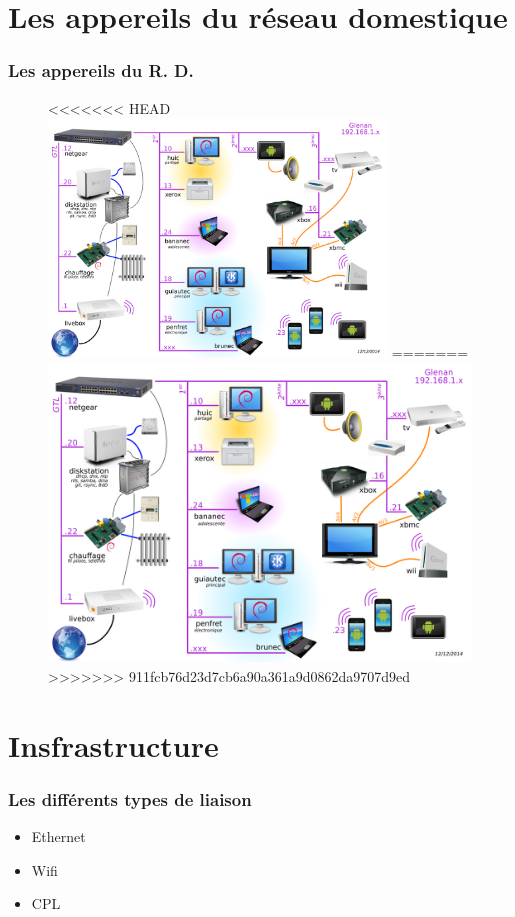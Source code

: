 \documentclass[handout]{beamer}
\begin{document}
\section{Les appereils du réseau domestique}
\begin{frame}\frametitle{Les appereils du R. D.} 
\begin{figure}
		\centering
<<<<<<< HEAD
		\includegraphics[width=0.8\textwidth,natwidth=100,natheight=100]{image/LAN6.png}
=======
		\includegraphics[width=\textwidth,height=0.8\textheight,keepaspectratio]{image/LAN6.png}
>>>>>>> 911fcb76d23d7cb6a90a361a9d0862da9707d9ed
\end{figure}
\end{frame}

\section{Insfrastructure}
\begin{frame}\frametitle{Les différents types de liaison} 
\begin{itemize}
\item Ethernet
\item Wifi
\item CPL
\end{itemize}
\end{frame}
\end{document}
